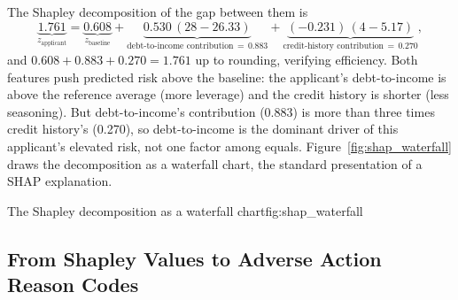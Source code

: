 \documentclass[../ai_in_finance]{subfiles}
\begin{document}
The Shapley decomposition of the gap between them is
\begin{equation*}
\underbrace{1.761}_{z_{\text{applicant}}} = \underbrace{0.608}_{z_{\text{baseline}}} + \underbrace{0.530\,(28 - 26.33)}_{\text{debt-to-income contribution} \,=\, 0.883} + \underbrace{(-0.231)\,(4 - 5.17)}_{\text{credit-history contribution} \,=\, 0.270},
\end{equation*}
and $0.608 + 0.883 + 0.270 = 1.761$ up to rounding, verifying efficiency. Both features push predicted risk above the baseline: the applicant's debt-to-income is above the reference average (more leverage) and the credit history is shorter (less seasoning). But debt-to-income's contribution (0.883) is more than three times credit history's (0.270), so debt-to-income is the dominant driver of this applicant's elevated risk, not one factor among equals. Figure~\ref{fig:shap_waterfall} draws the decomposition as a waterfall chart, the standard presentation of a SHAP explanation.

\begin{bookfigure}[htbp]{The Shapley decomposition as a waterfall chart}{fig:shap_waterfall}
\end{bookfigure}

\subsection{From Shapley Values to Adverse Action Reason Codes}
\label{sec:adverse-action}
\end{document}
